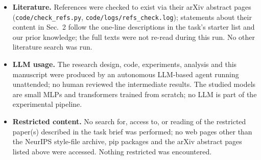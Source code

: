 \begin{itemize}
\item \textbf{Literature.} References were checked to exist via their arXiv abstract pages (\texttt{code/check\_refs.py}, \texttt{code/logs/refs\_check.log}); statements about their content in Sec.~2 follow the one-line descriptions in the task's starter list and our prior knowledge; the full texts were not re-read during this run. No other literature search was run.
\item \textbf{LLM usage.} The research design, code, experiments, analysis and this manuscript were produced by an autonomous LLM-based agent running unattended; no human reviewed the intermediate results. The studied models are small MLPs and transformers trained from scratch; no LLM is part of the experimental pipeline.
\item \textbf{Restricted content.} No search for, access to, or reading of the restricted paper(s) described in the task brief was performed; no web pages other than the NeurIPS style-file archive, pip packages and the arXiv abstract pages listed above were accessed. Nothing restricted was encountered.
\end{itemize}
